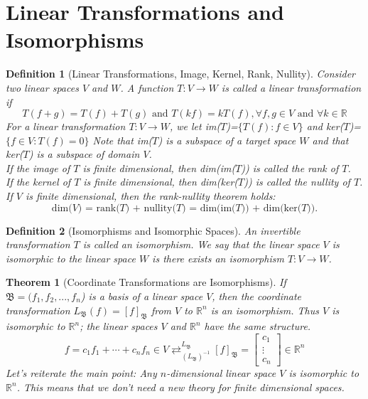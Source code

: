 \documentclass[10pt]{report}
\newtheorem{thm2}{Theorem}[section]
\newtheorem{def2}{Definition}[section]
\begin{document}
\section{Linear Transformations and Isomorphisms}
\begin{def2}[Linear Transformations, Image, Kernel, Rank, Nullity]
Consider two linear spaces $V$ and $W$. A function $T:V\to W$ is called a linear transformation if
$$T(f+g)=T(f)+T(g) \text{ and } T(kf)=kT(f), \forall f,g\in V \text{ and } \forall k\in \mathbb{R}$$
For a linear transformation $T:V\to W$, we let im($T$)=$\{T(f):f\in V\}$ and ker($T$)=$\{f\in V: T(f)=0\}$
Note that im($T$) is a subspace of a target space $W$ and that ker($T$) is a subspace of domain $V$.\\ If the image of $T$ is finite dimensional, then dim(im($T$)) is called the rank of $T$.\\ If the kernel of $T$ is finite dimensional, then dim(ker($T$)) is called the nullity of $T$.\\ If $V$ is finite dimensional, then the rank-nullity theorem holds: $$\text{dim($V$) = rank($T$) + nullity($T$) = dim(im($T$)) + dim(ker($T$)).}$$
\end{def2}
\begin{def2}[Isomorphisms and Isomorphic Spaces]
An invertible transformation $T$ is called an isomorphism. We say that the linear space $V$ is isomorphic to the linear space $W$ is there exists an isomorphism $T:V\to W$.
\end{def2}
\begin{thm2}[Coordinate Transformations are Isomorphisms]
If $\mathfrak{B}=(f_1, f_2, ..., f_n$) is a basis of a linear space $V$, then the coordinate transformation $L_\mathfrak{B}(f)=[f]_\mathfrak{B}$ from $V$ to $\mathbb{R}^n$ is an isomorphism. Thus $V$ is isomorphic to $\mathbb{R}^n$; the linear spaces $V$ and $\mathbb{R}^n$ have the same structure.
$$f=c_1f_1 + \cdots + c_nf_n\in V \rightleftarrows_{(L_\mathfrak{B})^{-1}}^{L_\mathfrak{B}} [f]_\mathfrak{B} = \left[\begin{array}{c}
c_1\\
\vdots\\
c_n
\end{array}\right] \in \mathbb{R}^n$$
Let's reiterate the main point: Any $n$-dimensional linear space $V$ is isomorphic to $\mathbb{R}^n$. This means that we don't need a new theory for finite dimensional spaces. 
\end{thm2}
\end{document}
